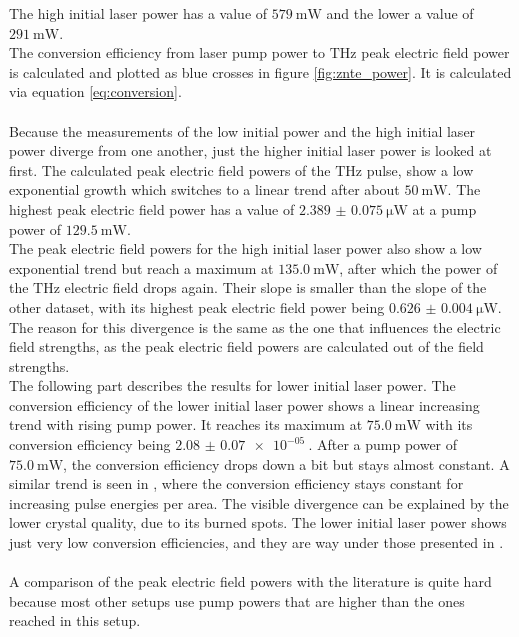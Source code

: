 The high initial laser power has a value of $\SI{579}{\milli\W}$ and the lower a value of $\SI{291}{\milli\W}$.
\\
The conversion efficiency from laser pump power to $\si{\tera\hertz}$ peak electric field power is calculated and plotted as blue crosses in figure \ref{fig:znte_power}.
It is calculated via equation \eqref{eq:conversion}.
\\\\
Because the measurements of the low initial power and the high initial laser power diverge from one another, just the higher initial laser power is looked at first.
The calculated peak electric field powers of the $\si{\tera\hertz}$ pulse, show a low exponential growth which switches to a linear trend after about $\SI{50}{\milli\W}$.
The highest peak electric field power has a value of $\SI{2.389(75)}{\micro\W}$ at a pump power of $\SI{129.5}{\milli\W}$.
\\
The peak electric field powers for the high initial laser power also show a low exponential trend but reach a maximum at $\SI{135.0}{\milli\W}$, after which the power of the $\si{\tera\hertz}$ electric field drops again.
Their slope is smaller than the slope of the other dataset, with its highest peak electric field power being $\SI{0.626(4)}{\micro\W}$.
The reason for this divergence is the same as the one that influences the electric field strengths, as the peak electric field powers are calculated out of the field strengths.
\\
The following part describes the results for lower initial laser power.
The conversion efficiency of the lower initial laser power shows a linear increasing trend with rising pump power.
It reaches its maximum at $\SI{75.0}{\milli\W}$ with its conversion efficiency being $\SI{2.08(7)e-05}{}$.
After a pump power of $\SI{75.0}{\milli\W}$, the conversion efficiency drops down a bit but stays almost constant.
A similar trend is seen in \cite{THZ_eltric_field}, where the conversion efficiency stays constant for increasing pulse energies per area.
The visible divergence can be explained by the lower crystal quality, due to its burned spots.
The lower initial laser power shows just very low conversion efficiencies, and they are way under those presented in \cite{THZ_eltric_field}.
\\\\
A comparison of the peak electric field powers with the literature is quite hard because most other setups use pump powers that are higher than the ones reached in this setup.
